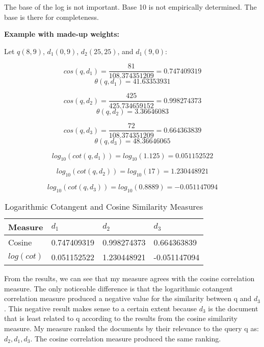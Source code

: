 The base of the log is not important. Base 10 is not empirically determined. The base is there for completeness.

\textbf{Example with made-up weights:}

Let $q(8,9)$, $d_1(0,9)$, $d_2(25,25)$, and $d_1(9,0)$:

$$cos(q,d_1) = \frac{81}{108.374351209} = 0.747409319$$
$$\theta(q,d_1) = 41.63353931$$

$$cos(q,d_2) = \frac{425}{425.734659152} = 0.998274373$$
$$\theta(q,d_2) = 3.36646083$$

$$cos(q,d_3) = \frac{72}{108.374351209} = 0.664363839$$
$$\theta(q,d_3) = 48.36646065$$

$$log_{10}(cot(q,d_1)) = log_{10}(1.125) = 0.051152522$$

$$log_{10}(cot(q,d_2)) = log_{10}(17) = 1.230448921$$

$$log_{10}(cot(q,d_3)) = log_{10}(0.8889) = -0.051147094$$

\begin{longtable}{ |p{3cm}|p{3cm}|p{3cm}|p{3cm}| } 
\caption{Logarithmic Cotangent and Cosine Similarity Measures}\\    %
\hline
Measure & $d_1$ & $d_2$ & $d_3$ \\
 \hline 
 Cosine & 0.747409319 & 0.998274373 & 0.664363839 \\
 \hline
  $log(cot)$ & 0.051152522 & 1.230448921 & -0.051147094 \\
 \hline
\end{longtable}

From the results, we can see that my measure agrees with the cosine correlation measure. The only noticeable difference is that the logarithmic cotangent correlation measure produced a negative value for the similarity between q and $d_3$. This negative result makes sense to a certain extent because $d_3$ is the document that is least related to q according to the results from the cosine similarity measure. My measure ranked the documents by their relevance to the query q as: $d_2, d_1, d_3$. The cosine correlation measure produced the same ranking.



 
